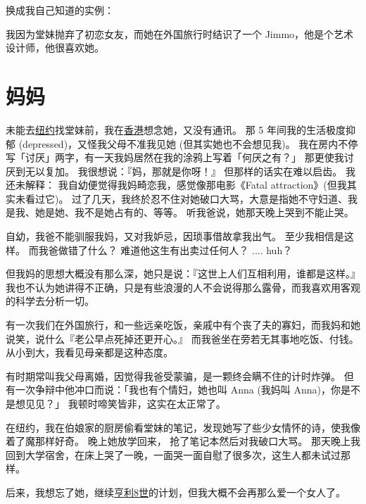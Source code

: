 \documentclass[12pt]{report}
\begin{document}
换成我自己知道的实例：
\begin{center}
\end{center}
我因为堂妹抛弃了初恋女友，而她在外国旅行时结识了一个 Jimmo，他是个艺术设计师，他很喜欢她。

\chapter{妈妈}

未能去\underline{纽约}找堂妹前，我在\underline{香港}想念她，又没有通讯。 那 5 年间我的生活极度抑郁 (depressed)，又怪我父母不准我见她 (但其实她也不会想见我)。 我在房内不停写「讨厌」两字，有一天我妈居然在我的涂鸦上写着「何厌之有？」 那更使我讨厌到无以复加。 我很想说：『妈，那就是你呀！』 但那样的话实在难以启齿。 我还未解释： 我自幼便觉得我妈畸恋我，感觉像那电影《Fatal attraction》(但我其实未看过它)。 过了几天，我终於忍不住对她破口大骂，大意是指她不守妇道、我是我、她是她、我不是她占有的、等等。 听我爸说，她那天晚上哭到不能止哭。

自幼，我爸不能驯服我妈，又对我妒忌，因琐事借故拿我出气。 至少我相信是这样。 而我爸做错了什么？ 难道他这生有出卖过任何人？ .... huh？

但我妈的思想大概没有那么深，她只是说：『这世上人们互相利用，谁都是这样。』 我也不认为她讲得不正确，只是有些浪漫的人不会说得那么露骨，而我喜欢用客观的科学去分析一切。

有一次我们在外国旅行，和一些远亲吃饭，亲戚中有个丧了夫的寡妇，而我妈和她说笑，说什么『老公早点死掉还更开心。』 而我爸坐在旁若无其事地吃饭、付钱。 从小到大，我看见母亲都是这种态度。

有时期常叫我父母离婚，因觉得我爸受蒙骗，是一颗终会瞒不住的计时炸弹。 但有一次争辩中他冲口而说：「我也有个情妇，她也叫 Anna (我妈叫 Anna)，你是不是想见见？」 我顿时啼笑皆非，这实在太正常了。

在纽约，我在伯娘家的厨房偷看堂妹的笔记，发现她写了些少女情怀的诗，使我像着了魔那样好奇。 晚上她放学回来， 抢了笔记本然后对我破口大骂。 那天晚上我回到大学宿舍，在床上哭了一晚，一面哭一面自慰了很多次，这生人都未试过那样。

后来，我想忘了她，继续\underline{亨利8世}的计划，但我大概不会再那么爱一个女人了。
\end{document}
